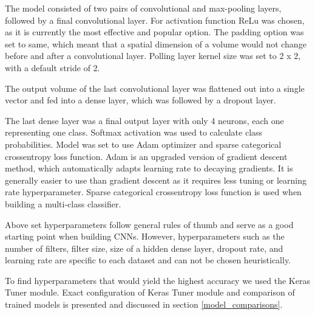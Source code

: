 The model consisted of two pairs of convolutional and max-pooling layers, followed by a final convolutional layer.
For activation function ReLu was chosen, as it is currently the most effective and popular option\cite{cs231n}\cite{geron}.
The padding option was set to same, which meant that a spatial dimension of a volume would not change before and after a convolutional layer.
Polling layer kernel size was set to 2 x 2, with a default stride of 2.

The output volume of the last convolutional layer was flattened out into a single vector and fed into a dense layer, which was followed by a dropout layer\footnotemark.


The last dense layer was a final output layer with only 4 neurons, each one representing one class.
Softmax activation was used to calculate class probabilities.
Model was set to use Adam optimizer and sparse categorical crossentropy loss function.
Adam is an upgraded version of gradient descent method, which automatically adapts learning rate to decaying gradients\cite{geron}.
It is generally easier to use than gradient descent as it requires less tuning or learning rate hyperparameter.
Sparse categorical crossentropy loss function is used when building a multi-class classifier.

Above set hyperparameters follow general rules of thumb and serve as a good starting point when building CNNs\cite{cs231n}.
However, hyperparameters such as the number of filters, filter size, size of a hidden dense layer, dropout rate, and learning rate are specific to each dataset and can not be chosen heuristically.

To find hyperparameters that would yield the highest accuracy we used the Keras Tuner module.
Exact configuration of Keras Tuner module and comparison of trained models is presented and discussed in section \ref{model_comparisons}.

